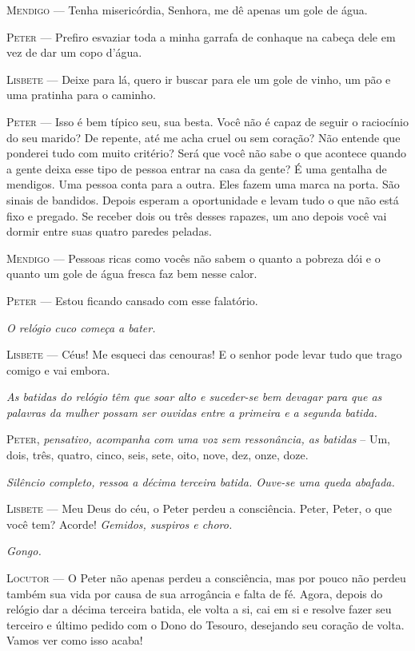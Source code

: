 \begin{myparindent}{0pt}
\begin{Parskip}
\textsc{Mendigo} --- Tenha misericórdia, Senhora, me dê apenas um gole de água.

\textsc{Peter} --- Prefiro esvaziar toda a minha garrafa de conhaque na cabeça
dele em vez de dar um copo d'água.

\textsc{Lisbete} --- Deixe para lá, quero ir buscar para ele um gole de vinho, um
pão e uma pratinha para o caminho.

\textsc{Peter} --- Isso é bem típico seu, sua besta. Você não é capaz de seguir o
raciocínio do seu marido? De repente, até me acha cruel ou sem coração?
Não entende que ponderei tudo com muito critério? Será que você não sabe
o que acontece quando a gente deixa esse tipo de pessoa entrar na casa
da gente? É uma gentalha de mendigos. Uma pessoa conta para a outra.
Eles fazem uma marca na porta. São sinais de bandidos. Depois esperam a
oportunidade e levam tudo o que não está fixo e pregado. Se receber dois
ou três desses rapazes, um ano depois você vai dormir entre suas quatro
paredes peladas.

\textsc{Mendigo} --- Pessoas ricas como vocês não sabem o quanto a pobreza dói e o
quanto um gole de água fresca faz bem nesse calor.

\textsc{Peter} --- Estou ficando cansado com esse falatório.

\emph{O relógio cuco começa a bater.}

\textsc{Lisbete} --- Céus! Me esqueci das cenouras! E o senhor pode levar tudo que
trago comigo e vai embora.

\emph{As batidas do relógio têm que soar alto e suceder-se bem devagar
para que as palavras da mulher possam ser ouvidas entre a primeira e a
segunda batida.}

\textsc{Peter}, \emph{pensativo, acompanha com uma voz sem ressonância, as
batidas} -- Um, dois, três, quatro, cinco, seis, sete, oito, nove, dez,
onze, doze.

\emph{Silêncio completo, ressoa a décima terceira batida. Ouve-se uma
queda abafada.}

\textsc{Lisbete} --- Meu Deus do céu, o Peter perdeu a consciência. Peter, Peter,
o que você tem? Acorde! \emph{Gemidos, suspiros e choro.}

\emph{Gongo.}

\textsc{Locutor} --- O Peter não apenas perdeu a consciência, mas por pouco não
perdeu também sua vida por causa de sua arrogância e falta de fé. Agora,
depois do relógio dar a décima terceira batida, ele volta a si, cai em
si e resolve fazer seu terceiro e último pedido com o Dono do Tesouro,
desejando seu coração de volta. Vamos ver como isso acaba!


\end{Parskip}
\end{myparindent}
